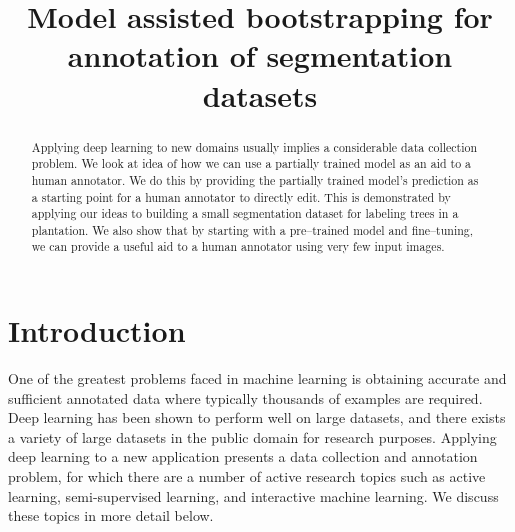\documentclass{IEEEtran}
\begin{document}
\title{Model assisted bootstrapping for annotation of segmentation datasets}

\author{
}

\maketitle


\printglossaries
{}



\begin{abstract}
 
Applying deep learning to new domains usually implies a considerable data collection problem. We look at idea of how we can use a partially trained model as an aid to a human annotator. We do this by providing the partially trained model's prediction as a starting point for a human annotator to directly edit. This is demonstrated by applying our ideas to building a small segmentation dataset for labeling trees in a plantation. We also show that by starting with a pre--trained model and fine--tuning, we can provide a useful aid to a human annotator using very few input images. 
\end{abstract} 
 


\section {Introduction}



One of the greatest problems faced in machine learning is obtaining accurate and sufficient annotated data where typically thousands of examples are required. Deep learning has been shown to perform well on large datasets, and there exists a variety of large datasets in the public domain for research purposes. Applying deep learning to a new application presents a data collection and annotation problem, for which there are a number of active research topics such as active learning, semi-supervised learning, and interactive machine learning. We discuss these topics in more detail below.
\end{document}
